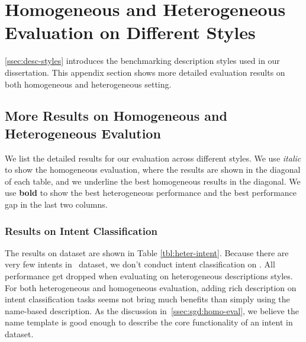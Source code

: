 \section[Homogeneous and Heterogeneous Evaluation on Different Styles]{Homogeneous and Heterogeneous \\Evaluation on Different Styles}
\label{sec:sgd:more-desc-results}
\autoref{ssec:desc-styles} introduces the benchmarking description
styles used in our dissertation. This appendix section shows more
detailed evaluation results on both homogeneous and heterogeneous
setting.


\subsection[More Results on Homogeneous and Heterogeneous Evalution]{More Results on Homogeneous and \\Heterogeneous Evalution}
\label{ssec:sgd:more-hete-results}
We list the detailed results for our evaluation across different
styles. We use {\it italic} to show the homogeneous evaluation, where
the results are shown in the diagonal of each table, and we
underline the best homogeneous results in the diagonal. We
use {\bf bold} to show the best heterogeneous performance and the best
performance gap in the last two columns.

\subsubsection{Results on Intent Classification}
\label{ssec:sgd:results-ic}
The results on \sgdst dataset are shown in Table
\ref{tbl:heter-intent}. Because there are very few intents in
\multiwoz~dataset, we don't conduct intent classification on
\multiwoz. All performance get dropped when evaluating on
heterogeneous descriptions styles. For both heterogeneous and
homogeneous evaluation, adding rich description on intent
classification tasks seems not bring much benefits than simply using
the name-based description. As the discussion
in~\autoref{ssec:sgd:homo-eval}, we believe the name template is good
enough to describe the core functionality of an intent in \sgdst
dataset.

